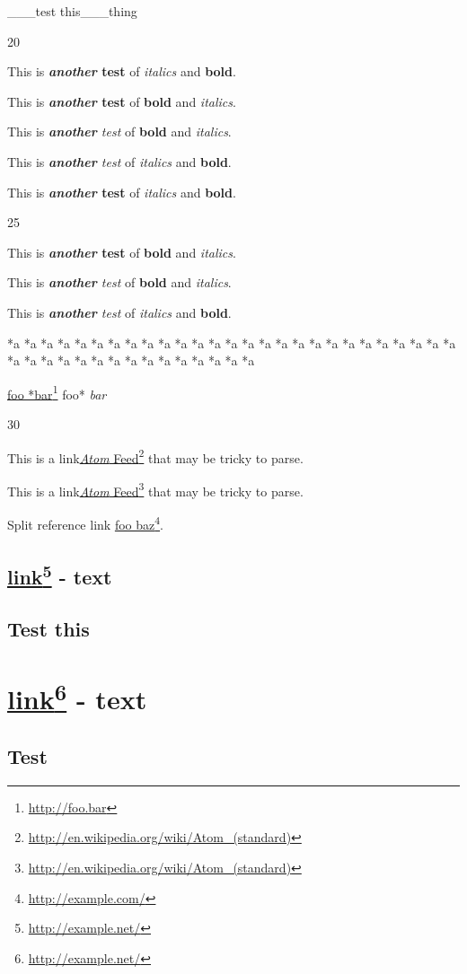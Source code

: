 \_\_\_test this\_\_\_thing

20

This is \textbf{\emph{another} test} of \emph{italics} and \textbf{bold}.

This is \textbf{\emph{another} test} of \textbf{bold} and \emph{italics}.

This is \emph{\textbf{another} test} of \textbf{bold} and \emph{italics}.

This is \emph{\textbf{another} test} of \emph{italics} and \textbf{bold}.

This is \textbf{\emph{another} test} of \emph{italics} and \textbf{bold}.

25

This is \textbf{\emph{another} test} of \textbf{bold} and \emph{italics}.

This is \emph{\textbf{another} test} of \textbf{bold} and \emph{italics}.

This is \emph{\textbf{another} test} of \emph{italics} and \textbf{bold}.

*a *a *a *a *a *a *a *a *a *a *a *a *a *a *a *a *a *a *a *a *a *a *a *a *a *a *a *a *a *a *a *a *a *a *a *a *a *a *a *a *a *a

\href{http://foo.bar}{foo *bar}\footnote{\href{http://foo.bar}{http://foo.bar}} foo* \emph{bar}

30

This is a link\href{http://en.wikipedia.org/wiki/Atom_(standard)}{\emph{Atom}
Feed}\footnote{\href{http://en.wikipedia.org/wiki/Atom_(standard)}{http://en.wikipedia.org/wiki/Atom\_(standard)}} that may be tricky to parse.

This is a link\href{http://en.wikipedia.org/wiki/Atom_(standard)}{\emph{Atom} Feed}\footnote{\href{http://en.wikipedia.org/wiki/Atom_(standard)}{http://en.wikipedia.org/wiki/Atom\_(standard)}} that may be tricky to parse.

Split reference link \href{http://example.com/}{foo
baz}\footnote{\href{http://example.com/}{http://example.com/}}.

\chapter{\href{http://example.net/}{link}\footnote{\href{http://example.net/}{http://example.net/}} - text}
\label{link-text}

\chapter{Test this}
\label{linky}

\part{\href{http://example.net/}{link}\footnote{\href{http://example.net/}{http://example.net/}} - text}
\label{link-text}

\chapter{Test}
\label{linkz}


